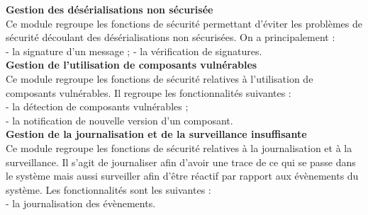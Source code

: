 \textbf{\RIGHTarrow Gestion des désérialisations non sécurisée}\\
Ce module regroupe les fonctions de sécurité permettant d'éviter les problèmes de sécurité découlant des désérialisations non sécurisées. On a principalement : \\
- la signature d'un message ;
- la vérification de signatures.\\


\textbf{\RIGHTarrow Gestion de l'utilisation de composants vulnérables}\\
Ce module regroupe les fonctions de sécurité relatives à l'utilisation de composants vulnérables. Il regroupe les fonctionnalités suivantes : \\
- la détection de composants vulnérables ; \\
- la notification de nouvelle version d'un composant.\\

\textbf{\RIGHTarrow Gestion de la journalisation et de la surveillance insuffisante}\\
Ce module regroupe les fonctions de sécurité relatives à la journalisation et à la surveillance. Il s'agit de journaliser afin d'avoir une trace de ce qui se passe dans le système mais aussi surveiller afin d'être réactif par rapport aux évènements du système. Les fonctionnalités sont les suivantes :\\
- la journalisation des évènements. \\


